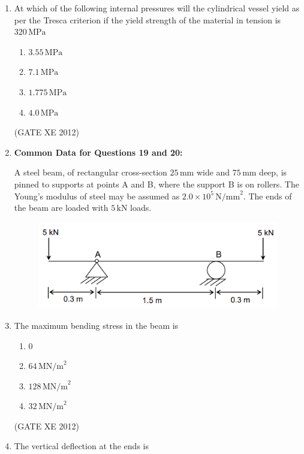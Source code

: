 \documentclass[12pt]{article}
\begin{document}
\begin{enumerate}
\item At which of the following internal pressures will the cylindrical vessel yield as per the Tresca criterion if the yield strength of the material in tension is $320 \, \text{MPa}$  

\begin{multicols}{4}
\begin{enumerate}
\item $3.55 \, \text{MPa}$
\item $7.1 \, \text{MPa}$
\item $1.775 \, \text{MPa}$
\item $4.0 \, \text{MPa}$
\end{enumerate}
\end{multicols}
(GATE XE 2012)

\item[] \textbf{Common Data for Questions 19 and 20:}

A steel beam, of rectangular cross-section $25 \, \text{mm}$ wide and $75 \, \text{mm}$ deep, is pinned to supports at points A and B, where the support B is on rollers. The Young’s modulus of steel may be assumed as $2.0 \times 10^{5} \, \text{N/mm}^2$. The ends of the beam are loaded with $5 \, \text{kN}$ loads. 

\begin{figure}[H]
    \centering
    \includegraphics[width=0.5\columnwidth]{figs/ass2_d_q19.png}
    \caption{}
    \label{fig:placeholder}
\end{figure}

\item The maximum bending stress in the beam is  

\begin{multicols}{4}
\begin{enumerate}
\item $0$
\item $64 \, \text{MN/m}^2$
\item $128 \, \text{MN/m}^2$
\item $32 \, \text{MN/m}^2$
\end{enumerate}
\end{multicols}
(GATE XE 2012)

\item The vertical deflection at the ends is  


\end{enumerate}
\end{document}
